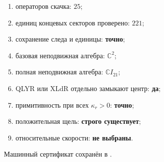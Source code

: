 \begin{protocol}
\begin{enumerate}
 \item операторов скачка: \textbf{$25$};
 \item единиц концевых секторов проверено: \textbf{$221$};
 \item сохранение следа и единицы: \textbf{точно};
 \item базовая неподвижная алгебра: \textbf{$\mathbb C^2$};
 \item полная неподвижная алгебра: \textbf{$\mathbb CI_{21}$};
 \item QLYR или XLdR отдельно замыкают центр: \textbf{да};
 \item примитивность при всех $\kappa_r>0$: \textbf{точно};
 \item положительная щель: \textbf{строго существует};
 \item относительные скорости: \textbf{не выбраны}.
\end{enumerate}
\end{protocol}

Машинный сертификат сохранён в
.